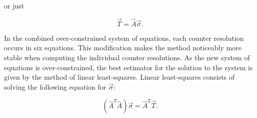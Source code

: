 or just

\[\vec{T} = \hat{A} \vec{\sigma}.\]

In the combined over-constrained system of equations, each counter
resolution occurs in six equations.  This modification makes the
method noticeably more stable when computing the individual counter
resolutions.  As the new system of equations is over-constrained, the
best estimator for the solution to the system is given by the method
of linear least-squares.  Linear least-squares consists of solving the
following equation for \(\vec{\sigma}\):

\[(\hat{A}^T \hat{A}) \vec{\sigma} = \hat{A}^T \vec{T}.\]

